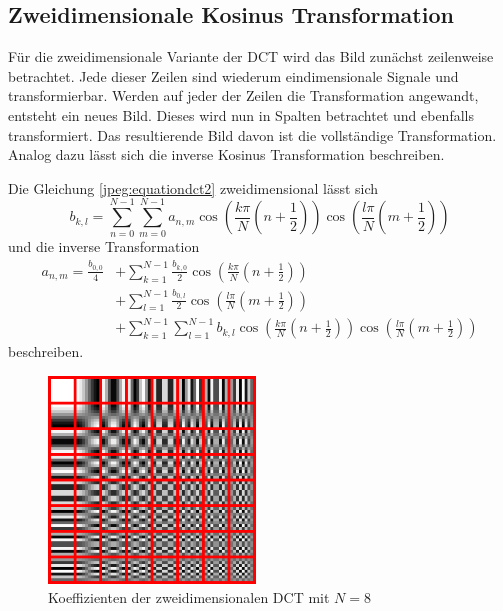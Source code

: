 \subsection{Zweidimensionale Kosinus Transformation
\label{jpeg:subsection:dctdim2}}
Für die zweidimensionale Variante der DCT wird das Bild zunächst zeilenweise betrachtet. Jede dieser Zeilen sind wiederum eindimensionale Signale und transformierbar.
Werden auf jeder der Zeilen die Transformation angewandt, entsteht ein neues Bild.
Dieses wird nun in Spalten betrachtet und ebenfalls transformiert.
Das resultierende Bild davon ist die vollständige Transformation.
Analog dazu lässt sich die inverse Kosinus Transformation beschreiben.

Die Gleichung \eqref{jpeg:equationdct2} zweidimensional lässt sich
\begin{equation}
    b_{k,l}
    =
    \sum \limits_{n=0}^{N-1} 
    \sum \limits_{m=0}^{N-1} a_{n,m} 
    \cos\left(
    \frac{k\pi}{N}\left(n + \frac{1}{2} \right) 
    \right)
    \cos\left(
    \frac{l\pi}{N}\left(m + \frac{1}{2} \right) 
    \right)
    \label{jpeg:equationdct2dim2}
\end{equation}
und die inverse Transformation  
\begin{align*}
    a_{n,m}
    =
    \frac{b_{0,0}}{4} &+
    \sum \limits_{k=1}^{N-1} 
    \frac{b_{k,0}}{2} 
    \cos\left(
    \frac{k\pi}{N}\left(n + \frac{1}{2} \right) 
    \right) \\ &+
    \sum \limits_{l=1}^{N-1} 
    \frac{b_{0,l}}{2} 
    \cos\left(
    \frac{l\pi}{N}\left(m + \frac{1}{2} \right) 
    \right) \\ &+
    \sum \limits_{k=1}^{N-1} 
    \sum \limits_{l=1}^{N-1} b_{k,l} 
    \cos\left(
    \frac{k\pi}{N}\left(n + \frac{1}{2} \right) 
    \right)
    \cos\left(
    \frac{l\pi}{N}\left(m + \frac{1}{2} \right) 
    \right)
    \label{jpeg:equationdct3dim2}
\end{align*}
beschreiben.

\begin{figure}
    \centering
    \includegraphics[width=55mm]{papers/jpeg/pictures/dctjpeg.pdf}
    \caption{Koeffizienten der zweidimensionalen DCT mit \(N=8\)
        \label{jpeg:fig:dctkoeff}}
\end{figure}

